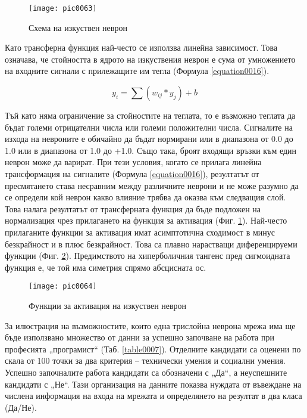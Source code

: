 \begin{figure}[h!]
  \centering
  \texttt{[image: pic0063]}
  \caption{Схема на изкуствен неврон}
\label{figure0063}
\end{figure}
\FloatBarrier

Като трансферна функция най-често се използва линейна зависимост. Това означава, че стойността в ядрото на изкуствения неврон е сума от умножението на входните сигнали с прилежащите им тегла (Формула \ref{equation0016}). 

\begin{equation}
y_i = \sum{(w_{ij}*y_j)} + b
\label{equation0016}
\end{equation}

Тъй като няма ограничение за стойностите на теглата, то е възможно теглата да бъдат големи отрицателни числа или големи положителни числа. Сигналите на изхода на невроните е обичайно да бъдат нормирани или в диапазона от 0.0 до 1.0 или в диапазона от 1.0 до +1.0. Също така, броят входящи връзки към един неврон може да варират. При тези условия, когато се прилага линейна трансформация на сигналите (Формула \ref{equation0016}), резултатът от пресмятането става несравним между различните неврони и не може разумно да се определи кой неврон какво влияние трябва да оказва към следващия слой. Това налага резултатът от трансферната функция да бъде подложен на нормализация чрез прилагането на функция за активация (Фиг. \ref{figure0063}). Най-често прилаганите функции за активация имат асимптотична сходимост в минус безкрайност и в плюс безкрайност. Това са плавно нарастващи диференцируеми функции (Фиг. \ref{figure0064}). Предимството на хиперболичния тангенс пред сигмоидната функция е, че той има симетрия спрямо абсцисната ос.

\begin{figure}[h!]
  \centering
  \texttt{[image: pic0064]}
  \caption{Функции за активация на изкуствен неврон}
\label{figure0064}
\end{figure}
\FloatBarrier

За илюстрация на възможностите, които една трислойна неврона мрежа има ще бъде използвано множество от данни за успешно започване на работа при професията „програмист“ (Таб. \ref{table0007}). Отделните кандидати са оценени по скала от 100 точки за два критерия – технически умения и социални умения. Успешно започналите работа кандидати са обозначени с „Да“, а неуспешните кандидати с „Не“. Тази организация на данните показва нуждата от въвеждане на числена информация на входа на мрежата и определянето на резултат в два класа (Да/Не).

